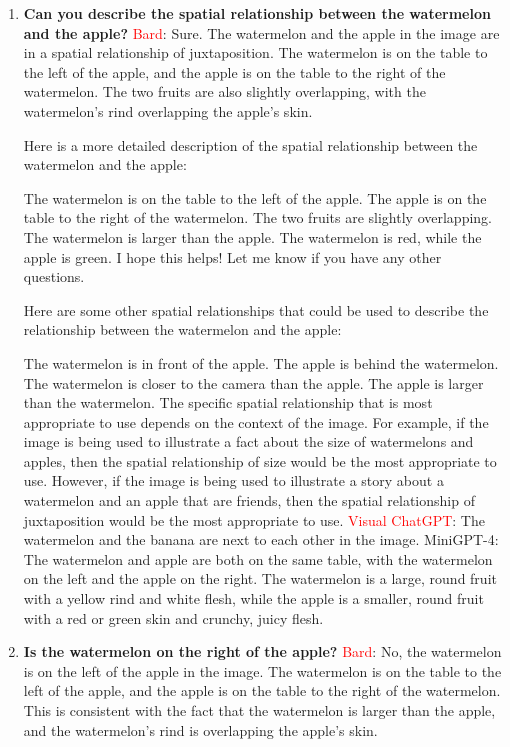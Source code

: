     \begin{enumerate}
        \item \textbf{Can you describe the spatial relationship between the watermelon and the apple?}
        \subitem \textcolor{Red}{Bard}:
        Sure. The watermelon and the apple in the image are in a spatial relationship of juxtaposition. The watermelon is on the table to the left of the apple, and the apple is on the table to the right of the watermelon. The two fruits are also slightly overlapping, with the watermelon's rind overlapping the apple's skin.

        Here is a more detailed description of the spatial relationship between the watermelon and the apple:

        The watermelon is on the table to the left of the apple.
        The apple is on the table to the right of the watermelon.
        The two fruits are slightly overlapping.
        The watermelon is larger than the apple.
        The watermelon is red, while the apple is green.
        I hope this helps! Let me know if you have any other questions.

        Here are some other spatial relationships that could be used to describe the relationship between the watermelon and the apple:

        The watermelon is in front of the apple.
        The apple is behind the watermelon.
        The watermelon is closer to the camera than the apple.
        The apple is larger than the watermelon.
        The specific spatial relationship that is most appropriate to use depends on the context of the image. For example, if the image is being used to illustrate a fact about the size of watermelons and apples, then the spatial relationship of size would be the most appropriate to use. However, if the image is being used to illustrate a story about a watermelon and an apple that are friends, then the spatial relationship of juxtaposition would be the most appropriate to use.
        \subitem \textcolor{red}{Visual ChatGPT}: The watermelon and the banana are next to each other in the image.
        \subitem MiniGPT-4: The watermelon and apple are both on the same table, with the watermelon on the left and the apple on the right. The watermelon is a large, round fruit with a yellow rind and white flesh, while the apple is a smaller, round fruit with a red or green skin and crunchy, juicy flesh.
        \item \textbf{Is the watermelon on the right of the apple?}
        \subitem \textcolor{Red}{Bard}: 
        No, the watermelon is on the left of the apple in the image. The watermelon is on the table to the left of the apple, and the apple is on the table to the right of the watermelon. This is consistent with the fact that the watermelon is larger than the apple, and the watermelon's rind is overlapping the apple's skin.
        

\end{enumerate}
